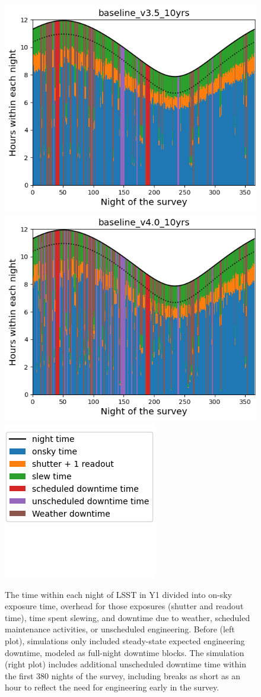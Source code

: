\begin{itemize}
\begin{figure}[!h]
    \centering
    \includegraphics[width=0.37\linewidth]{figures/downtime_v3_5_year1.png}
    \includegraphics[width=0.37\linewidth]{figures/downtime_v4_0_year1.png}
    \includegraphics[width=0.24\linewidth]{figures/downtime_v4_0_year1_legend.png}
    \caption{The time within each night of LSST in Y1 divided into on-sky exposure time, overhead for those exposures (shutter and readout time), time spent slewing, and downtime due to weather, scheduled maintenance activities, or unscheduled engineering. Before  (left plot), simulations only included steady-state expected engineering downtime, modeled as full-night downtime blocks. The  simulation (right plot) includes additional unscheduled downtime time within the first 380 nights of the survey, including breaks as short as an hour to reflect the need for engineering early in the survey. }
    \label{fig:downtime}
\end{figure}



\end{itemize}
